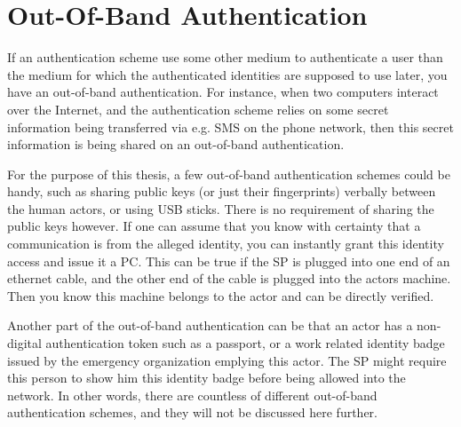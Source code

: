\section{Out-Of-Band Authentication}
If an authentication scheme use some other medium to authenticate a user than
the medium for which the authenticated identities are supposed to use later, you
have an out-of-band authentication. For instance, when two computers interact
over the Internet, and the authentication scheme relies on some secret
information being transferred via e.g. SMS on the phone network, then this
secret information is being shared on an out-of-band authentication.

For the purpose of this thesis, a few out-of-band authentication schemes could
be handy, such as sharing public keys (or just their fingerprints) verbally
between the human actors, or using USB sticks. There is no requirement of
sharing the public keys however. If one can assume that you know with certainty
that a communication is from the alleged identity, you can instantly grant this
identity access and issue it a PC. This can be true if the SP is plugged into
one end of an ethernet cable, and the other end of the cable is plugged into the
actors machine. Then you know this machine belongs to the actor and can be
directly verified.

Another part of the out-of-band authentication can be that an actor has a
non-digital authentication token such as a passport, or a work related identity
badge issued by the emergency organization emplying this actor. The SP might
require this person to show him this identity badge before being allowed into
the network. In other words, there are countless of different out-of-band
authentication schemes, and they will not be discussed here further.
